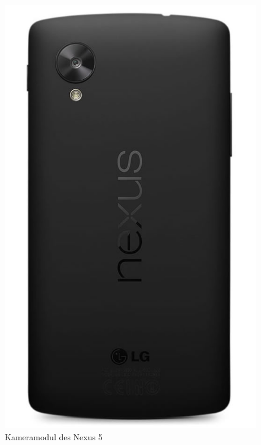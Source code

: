 \begin{figure}[h]
\centering
\includegraphics[width=\textwidth/3]{Bilder/Robot/nexus_backside}
\caption{Kameramodul des Nexus 5}
\label{fig:camera}
\end{figure}

